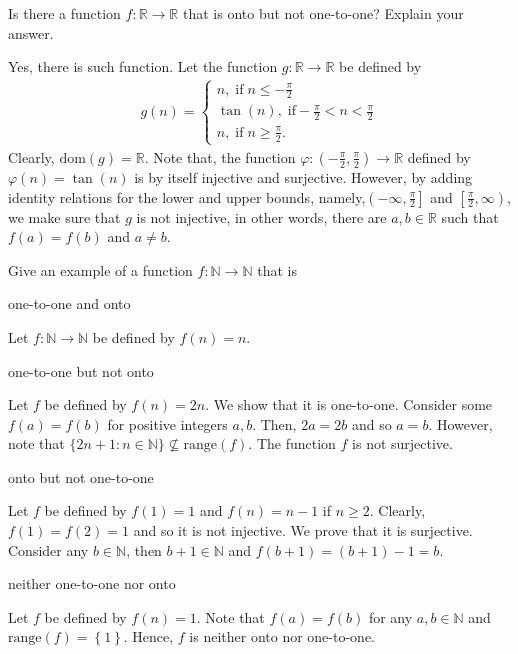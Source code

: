 \documentclass[12pt]{article}
\newcommand{\N}{\mathbb{N}}
\newcommand{\R}{\mathbb{R}}
\newenvironment{problem}[2][Problem]{\begin{trivlist} \item[\hskip \labelsep {\bfseries #1}\hskip \labelsep {\bfseries #2.}]}{\end{trivlist}}
\newenvironment{solution}[1][Solution]{\begin{trivlist} \item[\hskip \labelsep {\bfseries #1}]}{\end{trivlist}}
\begin{document}
    \begin{problem}{25}
      Is there a function $f:\R\to \R$ that is onto but not one-to-one? Explain your answer.
    \begin{solution}
      Yes, there is such function. Let the function $g:\R\to \R$ be defined by 
    \begin{align*}
      g(n) =
    \begin{cases}
      n, \; \mathrm{if}\; n\leq -\frac{\pi}{2}\\
      \tan(n), \; \mathrm{if }-\frac{\pi}{2}<n<\frac{\pi}{2}\\ 
      n, \; \mathrm{if}\; n\geq \frac{\pi}{2}.
    \end{cases}
    \end{align*}
    Clearly, $\mathrm{dom}(g)=\R$. Note that, the function $\varphi : \left(-\frac{\pi}{2},\frac{\pi}{2}\right)\to \R$ defined by $\varphi(n)=\tan(n)$ is by itself injective and surjective. However, by adding identity relations for the lower and upper bounds, namely,$\left(-\infty, \frac{\pi}{2}\right]$ and $\left[ \frac{\pi}{2},\infty \right)$, we make sure that $g$ is not injective, in other words, there are $a,b\in \R$ such that $f(a)=f(b)$ and $a\neq b$. 
    \end{solution}
    \end{problem}
    \begin{problem}{26}
      Give an example of a function $f:\N\to\N$ that is
    \begin{enumerate}[label=(\alph*)]
      \item one-to-one and onto 
    \begin{solution}
      Let $f:\N\to \N$ be defined by $f(n)=n$.
    \end{solution}
      \item one-to-one but not onto 
    \begin{solution}
      Let $f$ be defined by $f(n)=2n$. We show that it is one-to-one. Consider some $f(a)=f(b)$ for positive integers $a,b$. Then, $2a=2b$ and so $a=b$. However, note that $\{2n+1:n\in\N\}\not\subseteq \mathrm{range}(f)$. The function $f$ is not surjective.
    \end{solution}
      \item  onto but not one-to-one 
    \begin{solution}
      Let $f$ be defined by $f(1)=1$ and $f(n)=n-1$ if $n\geq 2$. Clearly, $f(1)=f(2)=1$ and so it is not injective. We prove that it is surjective. Consider any $b\in\N$, then $b+1\in \N$ and $f(b+1)=(b+1)-1=b$.
    \end{solution}
      \item neither one-to-one nor onto 
    \begin{solution}
      Let $f$ be defined by $f(n)=1$. Note that $f(a)=f(b)$ for any $a,b\in \N$ and $\mathrm{range}(f) = \left\{ 1 \right\}$. Hence, $f$ is neither onto nor one-to-one. 
    \end{solution}
    \end{enumerate}
    \end{problem}
\end{document}
